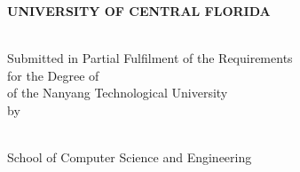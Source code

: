 \makeatletter
\begin{titlepage}
\begin{center}

\uppercase{\textbf{\large{University of Central Florida}}}
\\[6cm]

\uppercase{\textbf{\fypcode \\[0.3cm]\@title}}

\vfill

Submitted in Partial Fulfilment of the Requirements\\
for the Degree of \degree\\
of the Nanyang Technological University
\\[0.8cm]
by
\\[0.8cm]

\@author
\\[2cm]

\end{center}

School of Computer Science and Engineering\\
\@date
\end{titlepage}
\makeatother